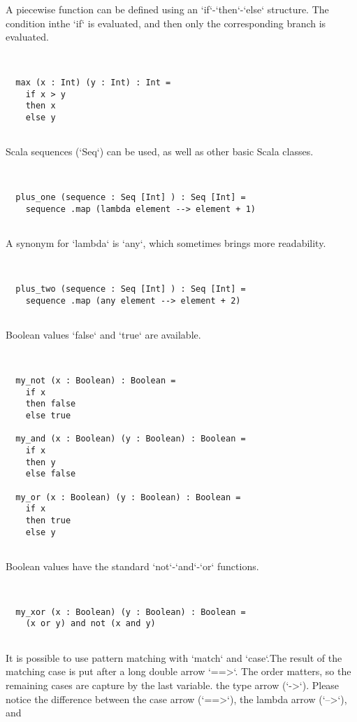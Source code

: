 \documentclass[12pt,a4paper]{article}
\begin{document}
A piecewise function can be defined using an `if`-`then`-`else` structure. The condition inthe `if` is evaluated, and then only the corresponding branch is evaluated. 


\begin{lstlisting}


  max (x : Int) (y : Int) : Int =
    if x > y
    then x
    else y


\end{lstlisting}

Scala sequences (`Seq`) can be used, as well as other basic Scala classes. 


\begin{lstlisting}


  plus_one (sequence : Seq [Int] ) : Seq [Int] =
    sequence .map (lambda element --> element + 1)


\end{lstlisting}

A synonym for `lambda` is `any`, which sometimes brings more readability. 


\begin{lstlisting}


  plus_two (sequence : Seq [Int] ) : Seq [Int] =
    sequence .map (any element --> element + 2)


\end{lstlisting}

Boolean values `false` and `true` are available. 


\begin{lstlisting}


  my_not (x : Boolean) : Boolean =
    if x
    then false
    else true

  my_and (x : Boolean) (y : Boolean) : Boolean =
    if x
    then y
    else false

  my_or (x : Boolean) (y : Boolean) : Boolean =
    if x
    then true
    else y


\end{lstlisting}

Boolean values have the standard `not`-`and`-`or` functions. 


\begin{lstlisting}


  my_xor (x : Boolean) (y : Boolean) : Boolean =
    (x or y) and not (x and y)


\end{lstlisting}

It is possible to use pattern matching with `match` and `case`.The result of the matching case is put after a long double arrow `==>`.
The order matters, so the remaining cases are capture by the last variable.
the type arrow (`->`). Please notice the difference between the case arrow (`==>`), the lambda arrow (`-->`), and
\end{document}
